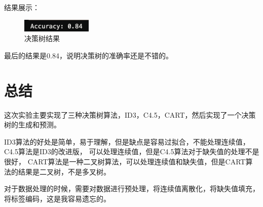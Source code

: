 \documentclass[12pt,a4paper,oneside]{article}
\begin{document}
结果展示：
\begin{figure}[H]
    \centering
    \includegraphics[width=0.3\textwidth]{image/5}
    \caption{决策树结果}
\end{figure}
最后的结果是0.84，说明决策树的准确率还是不错的。

\section{总结}
\qquad 这次实验主要实现了三种决策树算法，ID3，C4.5，CART，然后实现了一个决策树的生成和预测。

ID3算法的好处是简单，易于理解，但是缺点是容易过拟合，不能处理连续值，C4.5算法是ID3的改进版，
可以处理连续值，但是C4.5算法对于缺失值的处理不是很好，
CART算法是一种二叉树算法，可以处理连续值和缺失值，但是CART算法的结果是二叉树，不是多叉树。

对于数据处理的时候，需要对数据进行预处理，将连续值离散化，将缺失值填充，将标签编码，这是我容易遗忘的。
\end{document}
